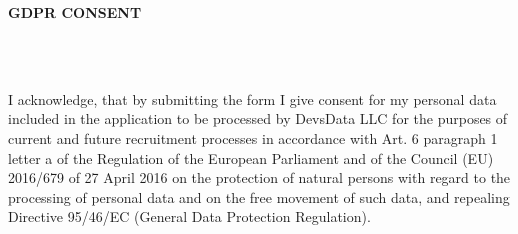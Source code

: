 \documentclass[a4paper,10pt]{article}
\newcommand{\lsep}{-0.5cm}
\newcommand{\resheading}[1]{{\small \colorbox{mygrey}{\begin{minipage}{0.975\textwidth}{\textbf{#1}}\end{minipage}}}}
\begin{document}
\resheading{\textbf{GDPR CONSENT}}\\[\lsep]\\

\hspace{0.11cm}
\begin{minipage}{0.98\textwidth}
I acknowledge, that by submitting the form I give consent for my personal data included in the application to be processed by DevsData LLC for the purposes of current and future recruitment processes in accordance with Art. 6 paragraph 1 letter a of the Regulation of the European Parliament and of the Council (EU) 2016/679 of 27 April 2016 on the protection of natural persons with regard to the processing of personal data and on the free movement of such data, and repealing Directive 95/46/EC (General Data Protection Regulation).
\end{minipage}
\end{document}
